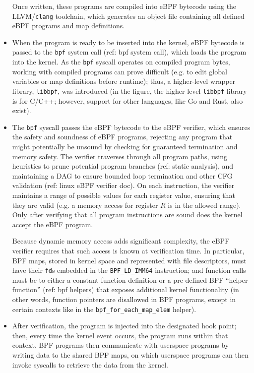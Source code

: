 \begin{itemize}
        Once written, these programs are compiled into eBPF bytecode using the LLVM/\texttt{clang}
        toolchain, which generates an object file containing all defined eBPF programs and map
        definitions. 

    \item When the program is ready to be inserted into the kernel, eBPF bytecode is passed to the
        \texttt{bpf} system call (ref: bpf system call), which loads the program into the kernel. As
        the \texttt{bpf} syscall operates on compiled program bytes, working with compiled programs
        can prove difficult (e.g. to edit global variables or map definitions before runtime); thus,
        a higher-level wrapper library, \texttt{libbpf}, was introduced (in the figure, the
        higher-level \texttt{libbpf} library is for C/C++; however, support for other languages,
        like Go and Rust, also exist).

    \item The \texttt{bpf} syscall passes the eBPF bytecode to the eBPF verifier, which ensures the
        safety and soundness of eBPF programs, rejecting any program that might potentially be
        unsound by checking for guaranteed termination and memory safety. The verifier traverses
        through all program paths, using heuristics to prune potential program branches (ref: static
        analysis), and maintaining a DAG to ensure bounded loop termination and other CFG validation
        (ref: linux eBPF verifier doc). On each instruction, the verifier maintains a range of
        possible values for each register value, ensuring that they are valid (e.g. a memory access
        for register $R$ is in the allowed range). Only after verifying that all program
        instructions are sound does the kernel accept the eBPF program.

        Because dynamic memory access adds significant complexity, the eBPF verifier requires that
        such access is known at verification time. In particular, BPF maps, stored in kernel space
        and represented with file descriptors, must have their \texttt{fd}s embedded in the
        \texttt{BPF\_LD\_IMM64} instruction; and function calls must be to either a constant
        function definition or a pre-defined BPF ``helper function'' (ref: bpf helpers) that exposes
        additional kernel functionality (in other words, function pointers are disallowed in BPF
        programs, except in certain contexts like in the \texttt{bpf\_for\_each\_map\_elem} helper).
    \item After verification, the program is injected into the designated hook point; then, every
        time the kernel event occurs, the program runs within that context. BPF programs then
        communicate with userspace programs by writing data to the shared BPF maps, on which
        userspace programs can then invoke syscalls to retrieve the data from the kernel.
\end{itemize}

